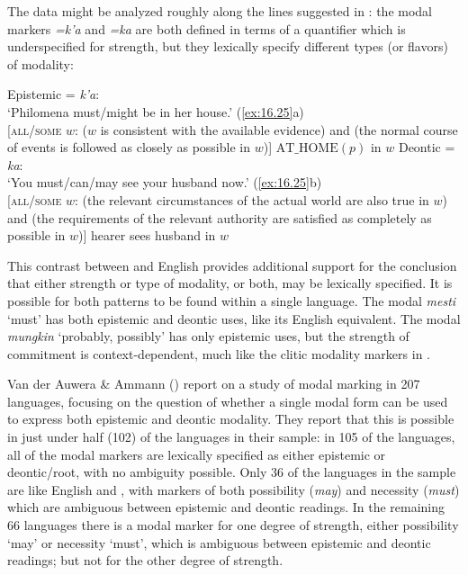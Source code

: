 The  data might be analyzed roughly along the lines suggested in : the modal markers \textit{=k’a} and \textit{=ka} are both defined in terms of a quantifier which is underspecified for strength, but they lexically specify different types (or flavors) of modality:


\ea \label{ex:16.26}
\ea Epistemic = \textit{k’a}:\\
‘Philomena must/might be in her house.’ (\ref{ex:16.25}a)\\
{}[\textsc{all/some} $w$: ($w$ is consistent with the available evidence) and (the normal course of events is followed as closely as possible in $w$)] $\text{AT\_HOME}(p)$ in $w$
\ex Deontic = \textit{ka}:\\
‘You must/can/may see your husband now.’ (\ref{ex:16.25}b)\\
{}[\textsc{all/some} $w$: (the relevant circumstances of the actual world are also true in $w$) and (the requirements of the relevant authority are satisfied as completely as possible in $w$)] hearer sees husband in $w$
\z \z


This contrast between  and English provides additional support for the conclusion that either strength or type of modality, or both, may be lexically specified. It is possible for both patterns to be found within a single language. The  modal \textit{mesti} ‘must’ has both epistemic and deontic uses, like its English equivalent. The  modal \textit{mungkin} ‘probably, possibly’ has only epistemic uses, but the strength of commitment is context-dependent, much like the clitic modality markers in .

Van der Auwera \& Ammann (\citeyear{vanderAuweraAmmann2013}) report on a study of modal marking in 207 languages, focusing on the question of whether a single modal form can be used to express both epistemic and deontic modality. They report that this is possible in just under half (102) of the languages in their sample: in 105 of the languages, all of the modal markers are lexically specified as either epistemic or deontic/root, with no ambiguity possible. Only 36 of the languages in the sample are like English and , with markers of both possibility (\textit{may}) and necessity (\textit{must}) which are ambiguous between epistemic and deontic readings. In the remaining 66 languages there is a modal marker for one degree of strength, either possibility ‘may’ or necessity ‘must’, which is ambiguous between epistemic and deontic readings; but not for the other degree of strength.


